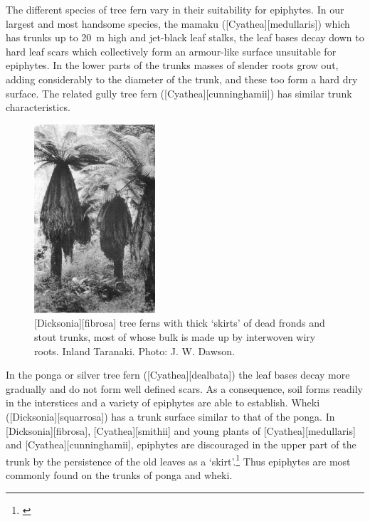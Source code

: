The different species of tree fern vary in their suitability for epiphytes.
In our largest and most handsome species, the mamaku ([Cyathea][medullaris]) which has trunks up to \SI{20}{\metre} high and jet-black leaf stalks, the leaf bases decay down to hard leaf scars which collectively form an armour-like surface unsuitable for epiphytes.
In the lower parts of the trunks masses of slender roots grow out, adding considerably to the diameter of the trunk, and these too form a hard dry surface.
The related gully tree fern ([Cyathea][cunninghamii]) has similar trunk characteristics.

\begin{figure}
	\includegraphics[width=0.4\textwidth]{graphics/figure54dicksonia-fibrosa.jpg}
	\centering
	\caption[\emph{Dicksonia fibrosa} tree ferns with thick `skirts' of dead fronds and stout trunks]{[Dicksonia][fibrosa] tree ferns with thick `skirts' of dead fronds and stout trunks, most of whose bulk is made up by interwoven wiry roots.
Inland Taranaki.
	Photo: J. W. Dawson.}%
	\label{fig:54dicksonia-fibrosa}
\end{figure}

In the ponga or silver tree fern ([Cyathea][dealbata]) the leaf bases decay more gradually and do not form well defined scars.
As a consequence, soil forms readily in the interstices and a variety of epiphytes are able to establish.
Wheki ([Dicksonia][squarrosa]) has a trunk surface similar to that of the ponga.
In [Dicksonia][fibrosa], [Cyathea][smithii] and young plants of [Cyathea][medullaris] and [Cyathea][cunninghamii],  epiphytes are discouraged in the upper part of the trunk by the persistence of the old leaves as a `skirt'.\footnote{\cite{page1986tree}}
Thus epiphytes are most commonly found on the trunks of ponga and wheki.

